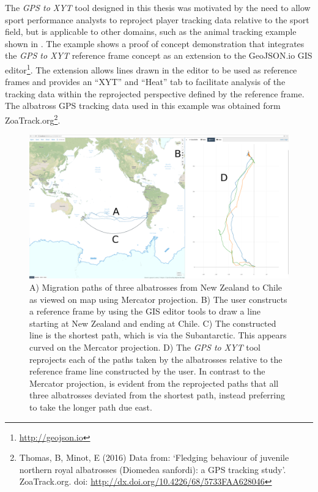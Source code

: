 The \textit{GPS to XYT} tool designed in this thesis was motivated by the need to allow sport performance analysts to reproject player tracking data relative to the sport field, but is applicable to other domains, such as the animal tracking example shown in . The example shows a proof of concept demonstration that integrates the \textit{GPS to XYT} reference frame concept as an extension to the GeoJSON.io GIS editor\footnote{\url{http://geojson.io}}. The extension allows lines drawn in the editor to be used as reference frames and provides an ``XYT'' and ``Heat'' tab to facilitate analysis of the tracking data within the reprojected perspective defined by the reference frame. The albatross GPS tracking data used in this example was obtained form ZoaTrack.org\footnote{Thomas, B, Minot, E (2016) Data from: `Fledging behaviour of juvenile northern royal albatrosses (Diomedea sanfordi): a GPS tracking study'. ZoaTrack.org. doi: \url{http://dx.doi.org/10.4226/68/5733FAA628046}}.

\begin{figure}
\includegraphics[width=1.0\linewidth]{figs/screenshot-xyt-annotation-export.png}
\caption{A) Migration paths of three albatrosses from New Zealand to Chile as viewed on map using Mercator projection. B) The user constructs a reference frame by using the GIS editor tools to draw a line starting at New Zealand and ending at Chile. C) The constructed line is the shortest path, which is via the Subantarctic. This appears curved on the Mercator projection. D) The \textit{GPS to XYT} tool reprojects each of the paths taken by the albatrosses relative to the reference frame line constructed by the user. In contrast to the Mercator projection, is evident from the reprojected paths that all three albatrosses deviated from the shortest path, instead preferring to take the longer path due east.}
\label{fig:animal-tracking}
\end{figure}

